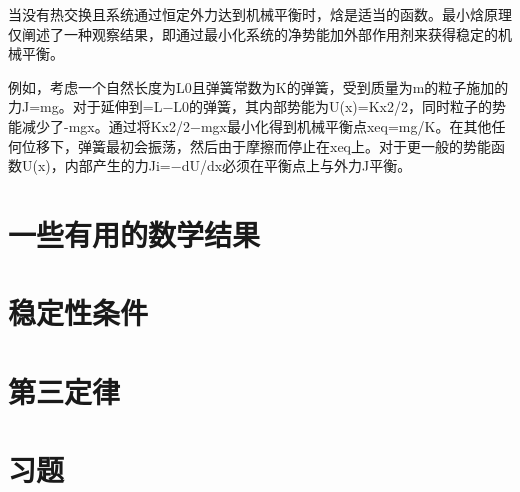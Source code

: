 	当没有热交换且系统通过恒定外力达到机械平衡时，焓是适当的函数。最小焓原理仅阐述了一种观察结果，即通过最小化系统的净势能加外部作用剂来获得稳定的机械平衡。

	例如，考虑一个自然长度为L0且弹簧常数为K的弹簧，受到质量为m的粒子施加的力J=mg。对于延伸到=L−L0的弹簧，其内部势能为U(x)=Kx2/2，同时粒子的势能减少了-mgx。通过将Kx2/2−mgx最小化得到机械平衡点xeq=mg/K。在其他任何位移下，弹簧最初会振荡，然后由于摩擦而停止在xeq上。对于更一般的势能函数U(x)，内部产生的力Ji=−dU/dx必须在平衡点上与外力J平衡。

\section{一些有用的数学结果}
\section{稳定性条件}
\section{第三定律}
\section*{习题}
